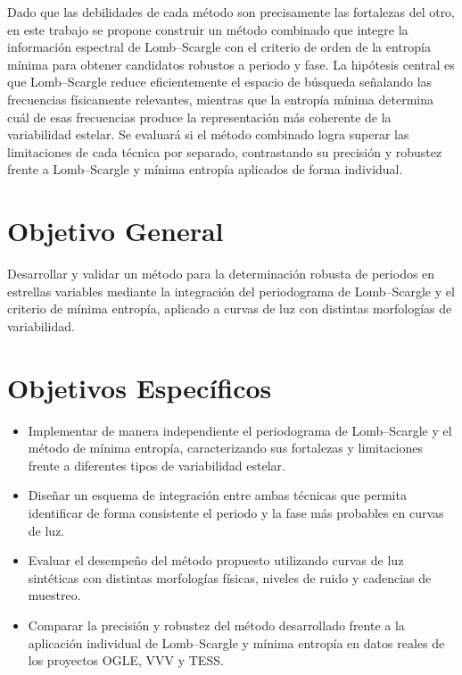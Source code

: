 \documentclass[letterpaper,12pt]{extarticle}
\begin{document}
Dado que las debilidades de cada método son precisamente las fortalezas del otro,
en este trabajo se propone construir un método combinado que integre la información
espectral de Lomb--Scargle con el criterio de orden de la entropía mínima para
obtener candidatos robustos a periodo y fase. La hipótesis central es que
Lomb--Scargle reduce eficientemente el espacio de búsqueda señalando las frecuencias
físicamente relevantes, mientras que la entropía mínima determina cuál de esas
frecuencias produce la representación más coherente de la variabilidad estelar.
Se evaluará si el método combinado logra superar las limitaciones de cada técnica
por separado, contrastando su precisión y robustez frente a Lomb--Scargle y mínima
entropía aplicados de forma individual.

\section{Objetivo General}

Desarrollar y validar un método para la determinación robusta de periodos en estrellas
variables mediante la integración del periodograma de Lomb--Scargle y el criterio de
mínima entropía, aplicado a curvas de luz con distintas morfologías de variabilidad.

\section{Objetivos Específicos}

\begin{itemize}
    \item Implementar de manera independiente el periodograma de Lomb--Scargle y el
método de mínima entropía, caracterizando sus fortalezas y limitaciones frente a
diferentes tipos de variabilidad estelar.
    \item Diseñar un esquema de integración entre ambas técnicas que permita identificar
de forma consistente el periodo y la fase más probables en curvas de luz.
    \item Evaluar el desempeño del método propuesto utilizando curvas de luz sintéticas
con distintas morfologías físicas, niveles de ruido y cadencias de muestreo.
    \item Comparar la precisión y robustez del método desarrollado frente a la aplicación
individual de Lomb--Scargle y mínima entropía en datos reales de los proyectos OGLE,
VVV y TESS. 
\end{itemize}
\end{document}
